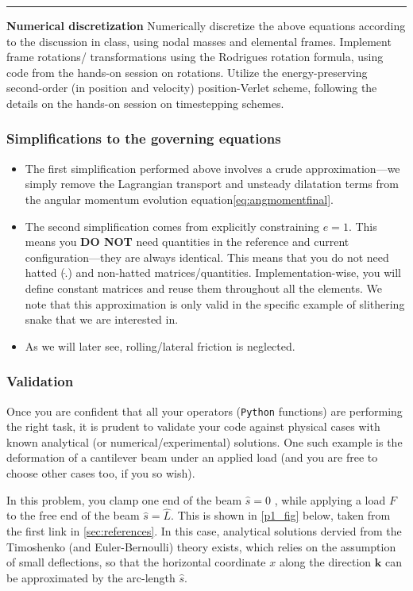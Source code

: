 \documentclass[11pt]{article}
\begin{document}
\noindent\rule{1\textwidth}{0.01pt}

\noindent \textbf{Numerical discretization}
Numerically discretize the above equations according to the discussion in
class, using nodal masses and elemental frames. Implement frame rotations/
transformations using the Rodrigues rotation formula, using code from the
hands-on session on rotations. Utilize the energy-preserving second-order
(in position and velocity) position-Verlet scheme, following the details on
the hands-on session on timestepping schemes.

\subsubsection{Simplifications to the governing equations}
\label{sec:org9706289}
\begin{itemize}
\item The first simplification performed above involves a crude
approximation---we simply remove the Lagrangian transport and unsteady
dilatation terms from the angular momentum evolution equation\cref{eq:angmomentfinal}.
\item The second simplification comes from explicitly constraining \(e = 1\).
This means you \textbf{DO NOT} need quantities in the reference and current
configuration---they are always identical. This means that you do not
need hatted (\(\hat{.}\)) and non-hatted matrices/quantities.
Implementation-wise, you will define constant matrices and reuse them
throughout all the elements. We note that this approximation is only
valid in the specific example of slithering snake that we are interested in.
\item As we will later see, rolling/lateral friction is neglected.
\end{itemize}
\subsubsection{Validation}
\label{sec:orgc9576f5}
Once you are confident that all your operators (\texttt{Python}  functions) are
performing the right task, it is prudent to validate your code against
physical cases with known analytical (or numerical/experimental) solutions.
One such example is the deformation of a cantilever beam under an applied
load (and you are free to choose other cases too, if you so wish).

In this problem, you clamp one end of the beam \(\hat{s}=0\) , while applying a load \(F\) to the free end of the beam \(\hat{s}=\hat{L}\). This is shown in \cref{p1_fig} below, taken
 from the first link in \cref{sec:references}. In this case, analytical solutions dervied from the Timoshenko (and
 Euler-Bernoulli) theory exists, which relies on the assumption of small
 deflections, so that the horizontal coordinate \(x\) along the direction
 \(\mathbf{k}\) can be approximated by the arc-length \(\hat{s}\).
\end{document}
